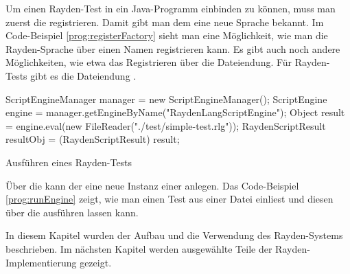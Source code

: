 \SuperPar
Um einen Rayden-Test in ein Java-Programm einbinden zu können, muss man zuerst die  registrieren. Damit gibt man dem  eine neue Sprache bekannt. Im Code-Beispiel \ref{prog:registerFactory} sieht man eine Möglichkeit, wie man die Rayden-Sprache über einen Namen registrieren kann. Es gibt auch noch andere Möglichkeiten, wie etwa das Registrieren über die Dateiendung. Für Rayden-Tests gibt es die Dateiendung .

\begin{program}
\begin{JavaCode}
ScriptEngineManager manager = new ScriptEngineManager();
ScriptEngine engine = manager.getEngineByName("RaydenLangScriptEngine");
Object result =  engine.eval(new FileReader("./test/simple-test.rlg"));
RaydenScriptResult resultObj = (RaydenScriptResult) result;
\end{JavaCode}
\caption{Ausführen eines Rayden-Tests}
\label{prog:runEngine}
\end{program}

\SuperPar
Über die  kann der  eine neue Instanz einer  anlegen. Das Code-Beispiel \ref{prog:runEngine} zeigt, wie man einen Test aus einer Datei einliest und diesen über die  ausführen lassen kann.

\SuperPar
In diesem Kapitel wurden der Aufbau und die Verwendung des Rayden-Systems beschrieben. Im nächsten Kapitel werden ausgewählte Teile der Rayden-Implementierung gezeigt.

